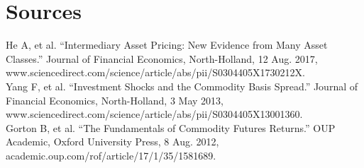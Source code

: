 \documentclass{article}
\begin{document}

\section{Sources}
He A, et al. “Intermediary Asset Pricing: New Evidence from Many Asset Classes.” Journal of Financial Economics, North-Holland, 12 Aug. 2017, www.sciencedirect.com/science/article/abs/pii/S0304405X1730212X. 
\\


Yang F, et al. “Investment Shocks and the Commodity Basis Spread.” Journal of Financial Economics, North-Holland, 3 May 2013, www.sciencedirect.com/science/article/abs/pii/S0304405X13001360. 
\\


Gorton B, et al. “The Fundamentals of Commodity Futures Returns.” OUP Academic, Oxford University Press, 8 Aug. 2012, academic.oup.com/rof/article/17/1/35/1581689. 

\end{document}
